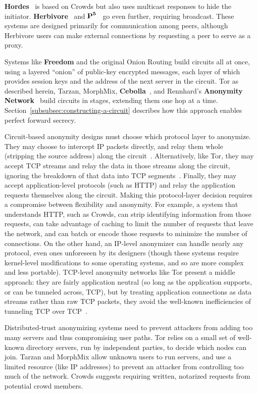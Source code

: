 \documentclass[twocolumn]{article}
\begin{document}
{\bf Hordes}~\cite{hordes-jcs} is based on Crowds but also uses multicast
responses to hide the initiator. {\bf Herbivore}~\cite{herbivore} and
$\mbox{\bf P}^{\mathbf 5}$~\cite{p5} go even further, requiring broadcast.
These systems are designed primarily for communication among peers,
although Herbivore users can make external connections by
requesting a peer to serve as a proxy.

Systems like {\bf Freedom} and the original Onion Routing build circuits
all at once, using a layered ``onion'' of public-key encrypted messages,
each layer of which provides session keys and the address of the
next server in the circuit. Tor as described herein, Tarzan, MorphMix,
{\bf Cebolla}~\cite{cebolla}, and Rennhard's {\bf Anonymity Network}~\cite{anonnet}
build circuits
in stages, extending them one hop at a time.
Section~\ref{subsubsec:constructing-a-circuit} describes how this
approach enables perfect forward secrecy.

Circuit-based anonymity designs must choose which protocol layer
to anonymize. They may choose to intercept IP packets directly, and
relay them whole (stripping the source address) along the
circuit~\cite{freedom2-arch,tarzan:ccs02}.  Alternatively, like
Tor, they may accept TCP streams and relay the data in those streams
along the circuit, ignoring the breakdown of that data into TCP
segments~\cite{morphmix:fc04,anonnet}. Finally, they may accept
application-level protocols (such as HTTP) and relay the application
requests themselves along the circuit.
Making this protocol-layer decision requires a compromise between flexibility
and anonymity.  For example, a system that understands HTTP, such as Crowds,
can strip
identifying information from those requests, can take advantage of caching
to limit the number of requests that leave the network, and can batch
or encode those requests to minimize the number of connections.
On the other hand, an IP-level anonymizer can handle nearly any protocol,
even ones unforeseen by its designers (though these systems require
kernel-level modifications to some operating systems, and so are more
complex and less portable). TCP-level anonymity networks like Tor present
a middle approach: they are fairly application neutral (so long as the
application supports, or can be tunneled across, TCP), but by treating
application connections as data streams rather than raw TCP packets,
they avoid the well-known inefficiencies of tunneling TCP over
TCP~\cite{tcp-over-tcp-is-bad}.

Distributed-trust anonymizing systems need to prevent attackers from
adding too many servers and thus compromising user paths.
Tor relies on a small set of well-known directory servers, run by
independent parties, to decide which nodes can
join. Tarzan and MorphMix allow unknown users to run servers, and use
a limited resource (like IP addresses) to prevent an attacker from
controlling too much of the network.  Crowds suggests requiring
written, notarized requests from potential crowd members.
\end{document}
